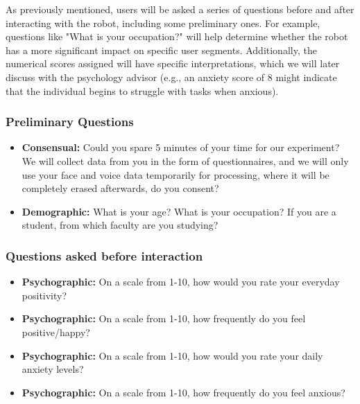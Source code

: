 As previously mentioned, users will be asked a series of questions before and after interacting with the robot, including some preliminary ones. For example, questions like "What is your occupation?" will help determine whether the robot has a more significant impact on specific user segments. Additionally, the numerical scores assigned will have specific interpretations, which we will later discuss with the psychology advisor (e.g., an anxiety score of 8 might indicate that the individual begins to struggle with tasks when anxious).

\subsubsection*{Preliminary Questions}
\begin{itemize}
    \item \textbf{Consensual:} Could you spare 5 minutes of your time for our experiment? We will collect data from you in the form of questionnaires, and we will only use your face and voice data temporarily for processing, where it will be completely erased afterwards, do you consent?
    \item \textbf{Demographic:} What is your age? What is your occupation? If you are a student, from which faculty are you studying?
\end{itemize}
\newpage
\subsubsection*{Questions asked before interaction}
\begin{itemize}
    \item \textbf{Psychographic:} On a scale from 1-10, how would you rate your everyday positivity? 
    \item \textbf{Psychographic:} On a scale from 1-10, how frequently do you feel positive/happy? 
    \item \textbf{Psychographic:} On a scale from 1-10, how would you rate your daily anxiety levels?
    \item \textbf{Psychographic:} On a scale from 1-10, how frequently do you feel anxious?
\end{itemize}



